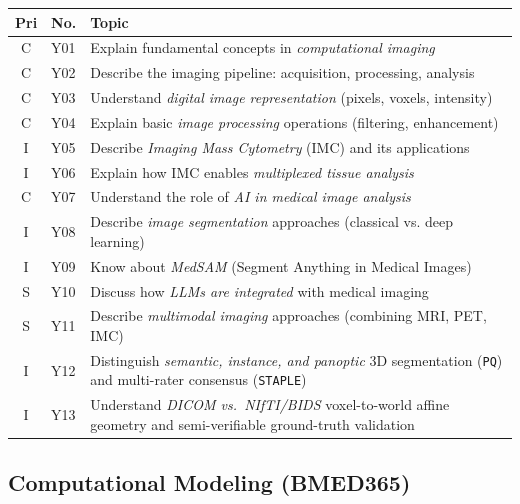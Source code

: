 \documentclass[11pt,a4paper]{article}
\begin{document}
\begin{longtable}{@{}clp{9cm}@{}}
\toprule
\textbf{Pri} & \textbf{No.} & \textbf{Topic} \\
\midrule
\endfirsthead
\midrule
\endhead
\midrule
\endfoot
\bottomrule
\endlastfoot
C & Y01 & Explain fundamental concepts in \emph{computational imaging} \\
C & Y02 & Describe the imaging pipeline: acquisition, processing, analysis \\
C & Y03 & Understand \emph{digital image representation} (pixels, voxels, intensity) \\
C & Y04 & Explain basic \emph{image processing} operations (filtering, enhancement) \\
I & Y05 & Describe \emph{Imaging Mass Cytometry} (IMC) and its applications \\
I & Y06 & Explain how IMC enables \emph{multiplexed tissue analysis} \\
C & Y07 & Understand the role of \emph{AI in medical image analysis} \\
I & Y08 & Describe \emph{image segmentation} approaches (classical vs. deep learning) \\
I & Y09 & Know about \emph{MedSAM} (Segment Anything in Medical Images) \\
S & Y10 & Discuss how \emph{LLMs are integrated} with medical imaging \\
S & Y11 & Describe \emph{multimodal imaging} approaches (combining MRI, PET, IMC) \\
I & Y12 & Distinguish \emph{semantic, instance, and panoptic} 3D segmentation (\texttt{PQ}) and multi-rater consensus (\texttt{STAPLE}) \\
I & Y13 & Understand \emph{DICOM vs.\ NIfTI/BIDS} voxel-to-world affine geometry and semi-verifiable ground-truth validation \\
\end{longtable}

\subsection{Computational Modeling (BMED365)}
\end{document}
